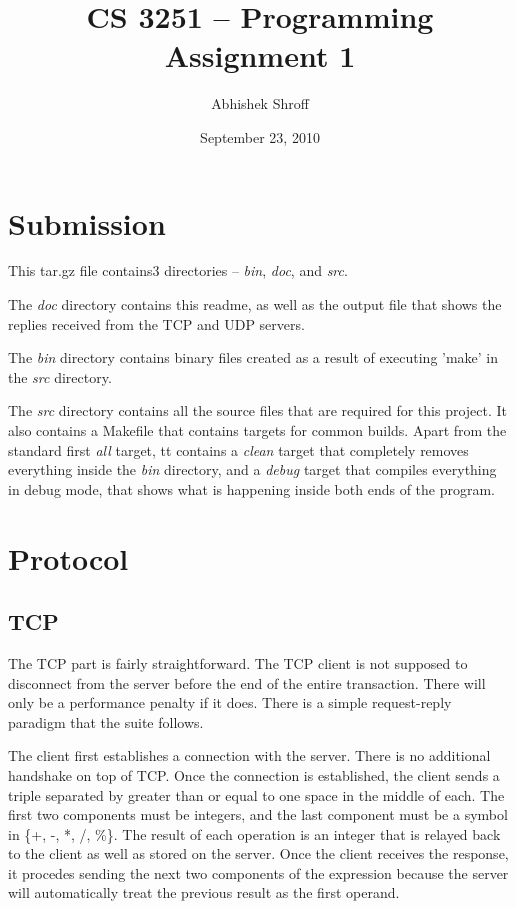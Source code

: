 \documentclass[12pt]{article}
\begin{document}
\title{CS 3251 -- Programming Assignment 1}
\author{Abhishek Shroff}
\date{September 23, 2010}
\maketitle

\section{Submission}
This tar.gz file contains3 directories -- \emph{bin}, \emph{doc}, and \emph{src}.

The \emph{doc} directory contains this readme, as well as the output file that shows the replies received from the TCP and UDP servers.

The \emph{bin} directory contains binary files created as a result of executing 'make' in the \emph{src} directory.

The \emph{src} directory contains all the source files that are required for this project. It also contains a Makefile that contains targets for common builds. Apart from the standard first \emph{all} target, tt contains a \emph{clean} target that completely removes everything inside the \emph{bin} directory, and a \emph{debug} target that compiles everything in debug mode, that shows what is happening inside both ends of the program.

\section{Protocol}
\subsection{TCP}
The TCP part is fairly straightforward. The TCP client is not supposed to disconnect from the server before the end of the entire transaction. There will only be a performance penalty if it does. There is a simple request-reply paradigm that the suite follows.

The client first establishes a connection with the server. There is no additional handshake on top of TCP. Once the connection is established, the client sends a triple separated by greater than or equal to one space in the middle of each. The first two components must be integers, and the last component must be a symbol in \{+, -, *, /, \%\}. The result of each operation is an integer that is relayed back to the client as well as stored on the server. Once the client receives the response, it procedes sending the next two components of the expression because the server will automatically treat the previous result as the first operand.
\end{document}
